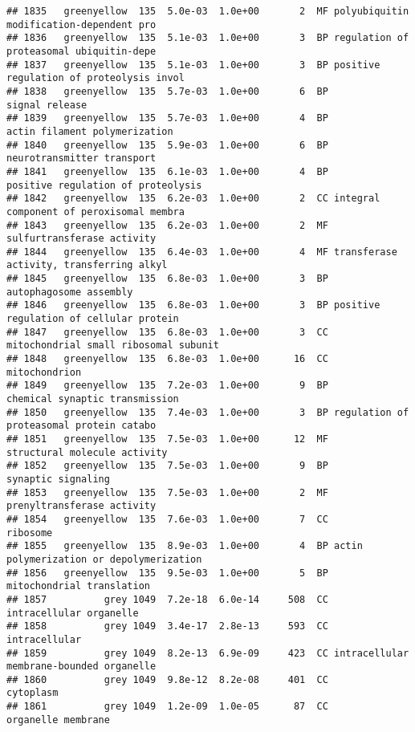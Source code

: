 \documentclass[]{article}
\begin{document}
\begin{verbatim}
## 1835   greenyellow  135  5.0e-03  1.0e+00       2  MF polyubiquitin modification-dependent pro
## 1836   greenyellow  135  5.1e-03  1.0e+00       3  BP regulation of proteasomal ubiquitin-depe
## 1837   greenyellow  135  5.1e-03  1.0e+00       3  BP positive regulation of proteolysis invol
## 1838   greenyellow  135  5.7e-03  1.0e+00       6  BP                           signal release
## 1839   greenyellow  135  5.7e-03  1.0e+00       4  BP            actin filament polymerization
## 1840   greenyellow  135  5.9e-03  1.0e+00       6  BP               neurotransmitter transport
## 1841   greenyellow  135  6.1e-03  1.0e+00       4  BP       positive regulation of proteolysis
## 1842   greenyellow  135  6.2e-03  1.0e+00       2  CC integral component of peroxisomal membra
## 1843   greenyellow  135  6.2e-03  1.0e+00       2  MF               sulfurtransferase activity
## 1844   greenyellow  135  6.4e-03  1.0e+00       4  MF transferase activity, transferring alkyl
## 1845   greenyellow  135  6.8e-03  1.0e+00       3  BP                   autophagosome assembly
## 1846   greenyellow  135  6.8e-03  1.0e+00       3  BP positive regulation of cellular protein 
## 1847   greenyellow  135  6.8e-03  1.0e+00       3  CC    mitochondrial small ribosomal subunit
## 1848   greenyellow  135  6.8e-03  1.0e+00      16  CC                            mitochondrion
## 1849   greenyellow  135  7.2e-03  1.0e+00       9  BP           chemical synaptic transmission
## 1850   greenyellow  135  7.4e-03  1.0e+00       3  BP regulation of proteasomal protein catabo
## 1851   greenyellow  135  7.5e-03  1.0e+00      12  MF             structural molecule activity
## 1852   greenyellow  135  7.5e-03  1.0e+00       9  BP                       synaptic signaling
## 1853   greenyellow  135  7.5e-03  1.0e+00       2  MF               prenyltransferase activity
## 1854   greenyellow  135  7.6e-03  1.0e+00       7  CC                                 ribosome
## 1855   greenyellow  135  8.9e-03  1.0e+00       4  BP actin polymerization or depolymerization
## 1856   greenyellow  135  9.5e-03  1.0e+00       5  BP                mitochondrial translation
## 1857          grey 1049  7.2e-18  6.0e-14     508  CC                  intracellular organelle
## 1858          grey 1049  3.4e-17  2.8e-13     593  CC                            intracellular
## 1859          grey 1049  8.2e-13  6.9e-09     423  CC intracellular membrane-bounded organelle
## 1860          grey 1049  9.8e-12  8.2e-08     401  CC                                cytoplasm
## 1861          grey 1049  1.2e-09  1.0e-05      87  CC                       organelle membrane

\end{verbatim}
\end{document}
